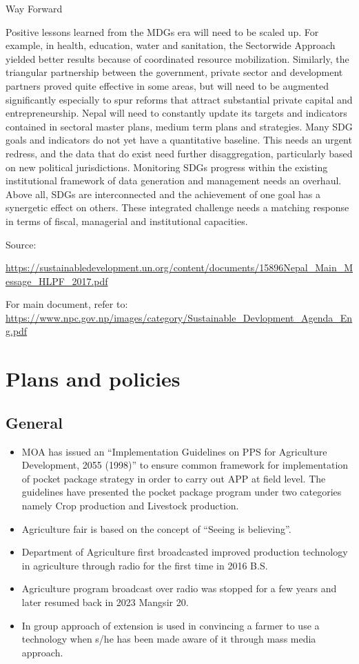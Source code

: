 \documentclass[
  openany]{book}
\providecommand{\tightlist}{%
  \setlength{\itemsep}{0pt}\setlength{\parskip}{0pt}}
\begin{document}
Way Forward

Positive lessons learned from the MDGs era will need to be scaled up. For example, in health, education, water and sanitation, the Sectorwide Approach yielded better results because of coordinated resource mobilization. Similarly, the triangular partnership between the government, private sector and development partners proved quite effective in some areas, but will need to be augmented significantly especially to spur reforms that attract substantial private capital and entrepreneurship. Nepal will need to constantly update its targets and indicators contained in sectoral master plans, medium term plans and strategies. Many SDG goals and indicators do not yet have a quantitative baseline. This needs an urgent redress, and the data that do exist need further disaggregation, particularly based on new political jurisdictions. Monitoring SDGs progress within the existing institutional framework of data generation and management needs an overhaul. Above all, SDGs are interconnected and the achievement of one goal has a synergetic effect on others. These integrated challenge needs a matching response in terms of fiscal, managerial and institutional capacities.

Source:

\url{https://sustainabledevelopment.un.org/content/documents/15896Nepal_Main_Message_HLPF_2017.pdf}

For main document, refer to: \url{https://www.npc.gov.np/images/category/Sustainable_Devlopment_Agenda_Eng.pdf}

\hypertarget{plans-and-policies}{%
\chapter{Plans and policies}\label{plans-and-policies}}

\hypertarget{general}{%
\section{General}\label{general}}

\begin{itemize}
\tightlist
\item
  MOA has issued an ``Implementation Guidelines on PPS for Agriculture Development, 2055 (1998)'' to ensure common framework for implementation of pocket package strategy in order to carry out APP at field level. The guidelines have presented the pocket package program under two categories namely Crop production and Livestock production.
\item
  Agriculture fair is based on the concept of ``Seeing is believing''.
\item
  Department of Agriculture first broadcasted improved production technology in agriculture through radio for the first time in 2016 B.S.
\item
  Agriculture program broadcast over radio was stopped for a few years and later resumed back in 2023 Mangsir 20.
\item
  In group approach of extension is used in convincing a farmer to use a technology when s/he has been made aware of it through mass media approach.
\end{itemize}
\end{document}
